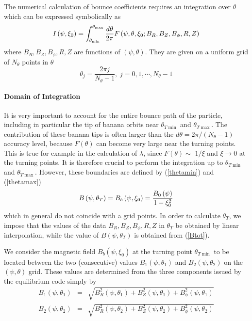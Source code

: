 

The numerical calculation of bounce coefficients requires an integration
over $\theta $ which can be expressed symbolically as
\begin{equation}
I\left( \psi ,\xi _{0}\right) =\int_{\theta _{\min }}^{\theta _{\max }}\frac{%
d\theta }{2\pi }F\left( \psi ,\theta ,\xi _{0};B_{R},B_{Z},B_{\phi
},R,Z\right)
\end{equation}
where $B_{R},B_{Z},B_{\phi },R,Z$ are functions of $\left( \psi ,\theta
\right) $. They are given on a uniform grid of $N_{\theta }$ points in $%
\theta $
\begin{equation}
\theta _{j}=\frac{2\pi j}{N_{\theta }-1},\;j=0,1,\cdots ,N_{\theta }-1
\end{equation}

\paragraph{Domain of Integration}

It is very important to account for the entire bounce path of the particle,
including in particular the tip of banana orbits near $\theta _{T\min }$ and
$\theta _{T\max }$. The contribution of these banana tips is often larger
than the $d\theta =2\pi /(N_{\theta }-1)$ accuracy level, because $F\left(
\theta \right) $ can become very large near the turning points. This is true
for example in the calculation of $\lambda $, since $F\left( \theta \right)
\sim $ $1/\xi $ and $\xi \rightarrow 0$ at the turning points. It is
therefore crucial to perform the integration up to $\theta _{T\min }$ and $%
\theta _{T\max }$. However, these boundaries are defined by (\ref{thetamin})
and (\ref{thetamax})
\begin{equation}
B\left( \psi ,\theta _{T}\right) =B_{b}\left( \psi ,\xi _{0}\right) =\frac{%
B_{0}\left( \psi \right) }{1-\xi _{0}^{2}}
\end{equation}
which in general do not coincide with a grid points. In order to calculate $%
\theta _{T}$, we impose that the values of the data $B_{R},B_{Z},B_{\phi
},R,Z$ in $\theta _{T}$ be obtained by linear interpolation, while the value
of $B\left( \psi ,\theta _{T}\right) $ is obtained from (\ref{Btot}).

We consider the magnetic field $B_{b}\left( \psi ,\xi _{0}\right) $ at the
turning point $\theta _{T\min }$ to be located between the two (consecutive)
values $B_{1}\left( \psi ,\theta _{1}\right) $ and $B_{2}\left( \psi ,\theta
_{2}\right) $ on the $\left( \psi ,\theta \right) $ grid. These values are
determined from the three components issued by the equilibrium code simply
by
\begin{eqnarray}
B_{1}\left( \psi ,\theta _{1}\right)  &=&\sqrt{B_{R}^{2}\left( \psi ,\theta
_{1}\right) +B_{Z}^{2}\left( \psi ,\theta _{1}\right) +B_{\phi }^{2}\left(
\psi ,\theta _{1}\right) } \\
B_{2}\left( \psi ,\theta _{2}\right)  &=&\sqrt{B_{R}^{2}\left( \psi ,\theta
_{2}\right) +B_{Z}^{2}\left( \psi ,\theta _{2}\right) +B_{\phi }^{2}\left(
\psi ,\theta _{2}\right) }
\end{eqnarray}

